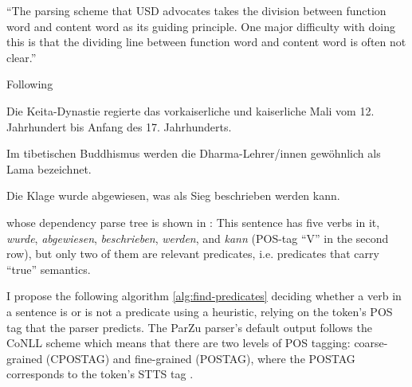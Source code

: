 ``The parsing scheme that USD advocates takes the division between function word and content
word as its guiding principle.  One major difficulty with doing this is that the dividing line
between function word and content word is often not clear.'' \cite{gross2015dependency}


Following \cite{foth2006umfassende}

\begin{examples}
	\label{ex:one-predicate}
	\item Die Keita-Dynastie regierte das vorkaiserliche und kaiserliche Mali vom 12. Jahrhundert bis Anfang des 17. Jahrhunderts.
\end{examples}

\begin{examples}
	\label{ex:one-predicate-mod}
	\item Im tibetischen Buddhismus werden die Dharma-Lehrer/innen gewöhnlich als Lama bezeichnet.
\end{examples}

\begin{examples}
	\label{ex:multiple-predicates}
	\item Die Klage wurde abgewiesen, was als Sieg beschrieben werden kann.
\end{examples}

whose dependency parse tree is shown in : This sentence has five
verbs in it, \textit{wurde}, \textit{abgewiesen}, \textit{beschrieben}, \textit{werden}, and
\textit{kann} (POS-tag ``V'' in the second row), but only two of them are relevant predicates,
i.e. predicates that carry ``true'' semantics.


I propose the following algorithm \ref{alg:find-predicates} deciding whether a verb in a sentence
is or is not a predicate using a heuristic, relying on the token's POS tag that the parser
predicts.  The ParZu parser's default output follows the CoNLL scheme \citep{buchholz2006conll}
which means that there are two levels of POS tagging: coarse-grained (CPOSTAG) and fine-grained
(POSTAG), where the POSTAG corresponds to the token's STTS tag \citep{schiller1999guidelines}.

